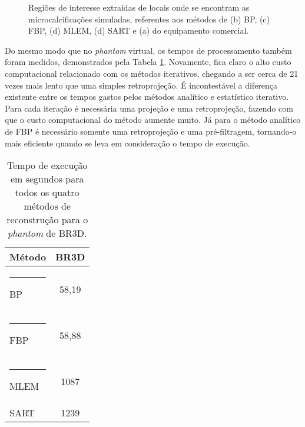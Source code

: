 \begin{figure}[!h]
	\centering
	\caption{Regiões de interesse extraídas de locais onde se encontram as microcalcificações simuladas, referentes aos métodos de (b) \acs{BP}, (c) \acs{FBP}, (d) \acs{MLEM}, (d) \acs{SART} e (a) do equipamento comercial.}	
	\hfill
	\hfill
	\hfill
	\hfill
	\label{fig:imgCap6BR3D_ROI}
\end{figure}


Do mesmo modo que no \textit{phantom} virtual, os tempos de processamento também foram medidos, demonstrados pela Tabela \ref{tab:tabCap6TimeBR3D}. Novamente, fica claro o alto custo computacional relacionado com os métodos iterativos, chegando  a ser cerca de 21 vezes mais lento que uma simples retroprojeção.  É incontestável a diferença existente entre os tempos gastos pelos métodos analítico e estatístico iterativo. Para cada iteração é necessária uma projeção e uma retroprojeção, fazendo com que o custo computacional do método aumente muito. Já para o método analítico de \acs{FBP} é necessário somente uma retroprojeção e uma pré-filtragem, tornando-o mais eficiente quando se leva em consideração o tempo de execução.

\begin{table}[!ht]
	\centering
	\caption{Tempo de execução em segundos para todos os quatro métodos de reconstrução para o \textit{phantom} de BR3D.}
	\label{tab:tabCap6TimeBR3D}
	\begin{tabular}{l|c}
		\textbf{Método}	     &   \textbf{BR3D}   	\\ 
		\hline
		\hline
		\rule[-0.5ex]{-3pt}{3ex}
		BP 	 		 						& 58,19					\\ 
		\hline
		\rule[-0.5ex]{-3pt}{3ex}
		FBP			 						& 58,88					\\
		\hline
		\rule[-0.5ex]{-3pt}{3ex}
		MLEM		 					& 1087 					\\
		\hline
		SART		 					& 1239 					\\
		\hline
	\end{tabular}
	\vspace{2ex}
\end{table}


